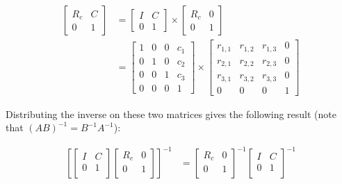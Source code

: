 \begin{align}
    \left [
        \begin{array}{c|c} 
            R_c & C \\
            \hline
            0 & 1 
        \end{array}
    \right ] &= 
    \left [
        \begin{array}{c|c} 
            I & C \\
            \hline
            0 & 1 
        \end{array}
    \right ] 
    \times
    \left [
        \begin{array}{c|c} 
            R_c & 0 \\
            \hline
            0 & 1 
        \end{array}
    \right ] \\
        &=
\left[ \begin{array}{ccc|c} 
1 & 0 & 0 & c_1 \\
0 & 1 & 0 & c_2 \\
0 & 0 & 1 & c_3 \\
  \hline
0 & 0 & 0 & 1
\end{array} \right] \times
\left[ \begin{array}{ccc|c} 
r_{1,1} & r_{1,2} & r_{1,3} & 0  \\
r_{2,1} & r_{2,2} & r_{2,3} & 0 \\
r_{3,1} & r_{3,2} & r_{3,3} & 0 \\
  \hline
0 & 0 & 0 & 1
\end{array} \right] 
\end{align}

Distributing the inverse on these two matrices gives the following result (note that $(AB)^{-1} = B^{-1}A^{-1}$):

\begin{align}
\left[
\left[
  \begin{array}{c|c}
    I & C \\
    \hline
    0 & 1 \\
  \end{array}
\right]
\left[
  \begin{array}{c|c}
    R_c & 0 \\
    \hline
    0 & 1 \\
  \end{array}
\right]
\right]^{-1} 
&= 
\left[
\begin{array}{c|c}
R_c & 0 \\
\hline
0 & 1 \\
\end{array}
\right]^{-1} 
\left[
\begin{array}{c|c}
I & C \\
\hline
0 & 1 \\
\end{array}
\right]^{-1} 
\end{align} 

